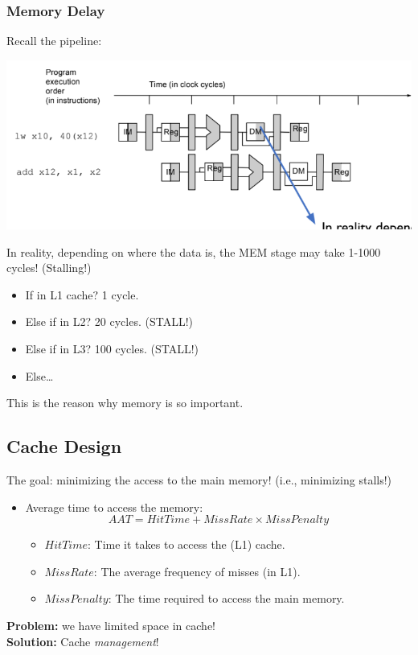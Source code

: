 \documentclass[10pt]{article}
\begin{document}
\subsubsection*{Memory Delay}
Recall the pipeline:
\begin{center}
    \includegraphics*[scale=0.8]{W6_6.png}
\end{center}
In reality, depending on where the data is, the MEM stage may take 1-1000 cycles!  (Stalling!)
\begin{itemize}
    \item If in L1 cache?  1 cycle.
    \item Else if in L2?  20 cycles.  (STALL!)
    \item Else if in L3?  100 cycles.  (STALL!)
    \item Else\dots
\end{itemize}
This is the reason why memory is so important.
\subsection*{Cache Design}
The goal: minimizing the access to the main memory!  (i.e., minimizing stalls!)
\begin{itemize}
    \item Average time to access the memory:
    \[AAT = HitTime + MissRate \times MissPenalty\]
    \begin{itemize}
        \item $HitTime$: Time it takes to access the (L1) cache.
        \item $MissRate$: The average frequency of misses (in L1).
        \item $MissPenalty$: The time required to access the main memory.
    \end{itemize}   
\end{itemize}
\textbf{Problem:} we have limited space in cache!\\
\textbf{Solution:} Cache \textit{management}!
\end{document}
